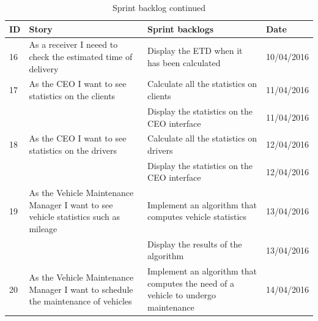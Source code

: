 \documentclass[paper=a4, fontsize=11pt]{scrartcl} %
\numberwithin{equation}{section} %
\numberwithin{figure}{section} %
\numberwithin{table}{section} %
\begin{document}
\begin{table}[!hbt]
\centering
\caption{Sprint backlog continued}
\label{SprintBacklogTableThird}
\begin{tabular}{|p{1cm}|p{5cm}|p{5cm}|p{2cm}|}
\hline
\textbf{ID} & \textbf{Story}                                                                                         & \textbf{Sprint backlogs}                                                          & \textbf{Date} \\ \hline
16          & As a receiver I neeed to check the estimated time of delivery                                          & Display the ETD when it has been calculated                                       & 10/04/2016    \\ \hline
17          & As the CEO I want to see statistics on the clients                                                     & Calculate all the statistics on clients                                           & 11/04/2016    \\ \hline
            &                                                                                                        & Display the statistics on the CEO interface                                       & 11/04/2016    \\ \hline
18          & As the CEO I want to see statistics on the drivers                                                     & Calculate all the statistics on drivers                                           & 12/04/2016    \\ \hline
            &                                                                                                        & Display the statistics on the CEO interface                                       & 12/04/2016    \\ \hline
19          & As the Vehicle Maintenance Manager I want to see vehicle statistics such as mileage                    & Implement an algorithm that computes vehicle statistics                           & 13/04/2016    \\ \hline
            &                                                                                                        & Display the results of the algorithm                                              & 13/04/2016    \\ \hline
20          & As the Vehicle Maintenance Manager I want to schedule the maintenance of vehicles                      & Implement an algorithm that computes the need of a vehicle to undergo maintenance & 14/04/2016    \\ \hline

\end{tabular}
\end{table}
\end{document}
